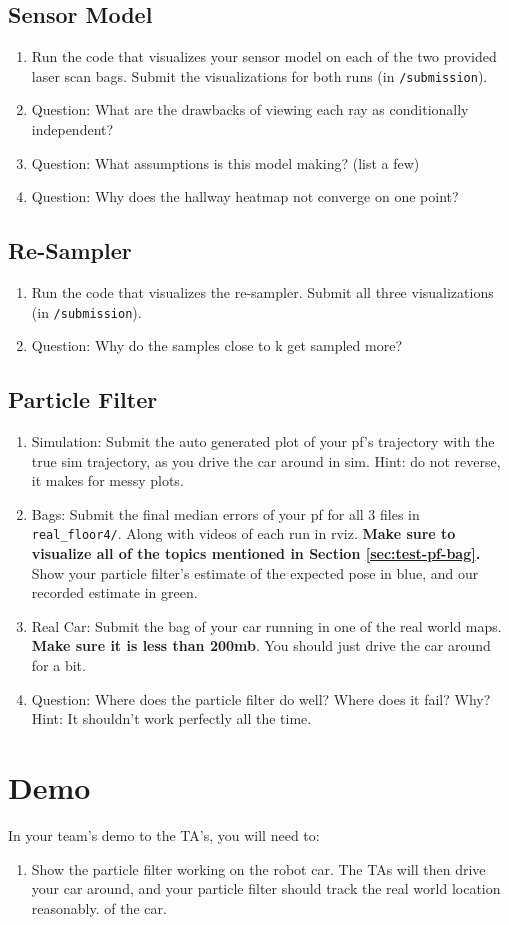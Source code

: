 \documentclass[final]{article}
\newcommand{\code}[1]{\texttt{#1}}
\begin{document}
\subsection{Sensor Model}
\begin{enumerate}
\item Run the code that visualizes your sensor model on each of the two provided laser scan bags. Submit the visualizations for both runs (in \code{/submission}).
\item Question: What are the drawbacks of viewing each ray as conditionally independent?
\item Question: What assumptions is this model making? (list a few)
\item Question: Why does the hallway heatmap not converge on one point?
\end{enumerate}

\subsection{Re-Sampler}
\begin{enumerate}
\item Run the code that visualizes the re-sampler. Submit all three visualizations (in \code{/submission}).
\item Question: Why do the samples close to k get sampled more?
\end{enumerate}

\subsection{Particle Filter}
\begin{enumerate}
\item Simulation: Submit the auto generated plot of your pf's trajectory with the true sim trajectory, as you drive the car around in sim. Hint: do not reverse, it makes for messy plots.
\item Bags: Submit the final median errors of your pf for all 3 files in \code{real\_floor4/}. Along with videos of each run in rviz. \textbf{Make sure to visualize all of the topics mentioned in Section \ref{sec:test-pf-bag}.} Show your particle filter's estimate of the expected pose in blue, and our recorded estimate in green.
\item Real Car: Submit the bag of your car running in one of the real world maps. \textbf{Make sure it is less than 200mb}. You should just drive the car around for a bit.
\item Question: Where does the particle filter do well? Where does it fail? Why? Hint: It shouldn’t work perfectly all the time.
\end{enumerate}

\section{Demo}

In your team’s demo to the TA’s, you will need to:
\begin{enumerate}
	\item Show the particle filter working on the robot car. The TAs will then drive your car around, and your particle filter should track the real world location reasonably.
of the car.
\end{enumerate}
\end{document}
